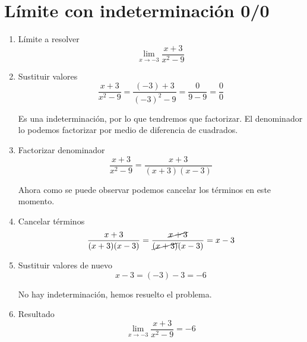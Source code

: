 \documentclass[a4paper,10pt]{article}
\begin{document}
\newpage

\section{Límite con indeterminación 0/0}

\begin{enumerate}
	\item Límite a resolver
	      \[
		      \lim_{x\to-3}\frac{x + 3}{x^{2} - 9}
	      \]
	\item Sustituir valores
	      \[
		      \frac{x + 3}{x^{2} - 9} = \frac{(-3) + 3}{(-3)^{2} - 9} = \frac{0}{9 - 9} = \frac{0}{0}
	      \]

	      Es una indeterminación, por lo que tendremos que factorizar. El denominador lo podemos factorizar por medio de diferencia de cuadrados.
	\item Factorizar denominador
	      \[
		      \frac{x + 3}{x^{2} - 9} = \frac{x + 3}{(x + 3)(x - 3)}
	      \]

	      Ahora como se puede observar podemos cancelar los términos en este momento.
	\item Cancelar términos
	      \[
		      \frac{x + 3}{(x + 3)(x - 3)} = \frac{\cancel{x + 3}}{\cancel{(x + 3)}(x - 3)} = x - 3
	      \]
	\item Sustituir valores de nuevo
	      \[
		      x - 3 = (-3) - 3 = -6
	      \]

	      No hay indeterminación, hemos resuelto el problema.
	\item Resultado
	      \[
		      \boxed{\lim_{x\to-3}\frac{x + 3}{x^{2} - 9} = -6}
	      \]
\end{enumerate}
\end{document}
